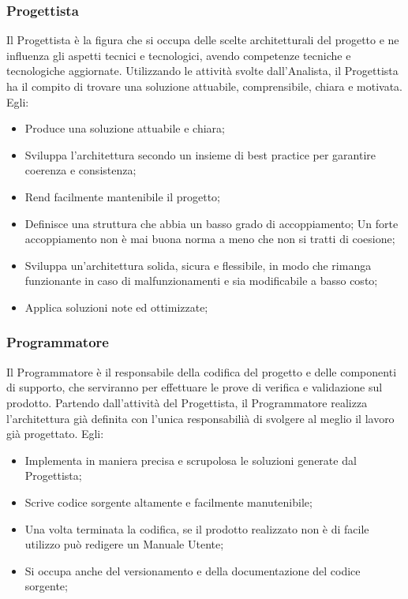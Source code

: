 \subsubsection{Progettista}
Il Progettista è la figura che si occupa delle scelte architetturali del progetto e ne influenza gli aspetti tecnici e tecnologici, avendo competenze tecniche e tecnologiche aggiornate.
Utilizzando le attività svolte dall'Analista, il Progettista ha il compito di trovare una soluzione attuabile, comprensibile, chiara e motivata.
Egli:
\begin{itemize}
\item{Produce una soluzione attuabile e chiara;}
\item{Sviluppa l’architettura secondo un insieme di best practice per garantire coerenza e consistenza;}
\item{Rend facilmente mantenibile il progetto;}
\item{Definisce una struttura che abbia un basso grado di accoppiamento; Un forte accoppiamento non è mai buona norma a meno che non si tratti di coesione;}
\item{Sviluppa un’architettura solida,  sicura  e  flessibile, in modo  che rimanga funzionante in caso di malfunzionamenti e sia modificabile a basso costo;}
\item{Applica soluzioni note ed ottimizzate;}
\end{itemize}

\subsubsection{Programmatore}
Il Programmatore è il responsabile della codifica del progetto e delle componenti di supporto, che serviranno per effettuare le prove di verifica e validazione sul prodotto.
Partendo dall’attività del Progettista, il Programmatore realizza l’architettura già definita con l’unica responsabilià di svolgere al meglio il lavoro già progettato.
Egli:
\begin{itemize}
\item{Implementa in maniera precisa e scrupolosa le soluzioni generate dal Progettista;}
\item{Scrive codice sorgente altamente e facilmente manutenibile;}
\item{Una volta terminata la codifica, se il prodotto realizzato non è di facile utilizzo può redigere un Manuale Utente;}
\item{Si occupa anche del versionamento e della documentazione del codice sorgente;}
\end{itemize}


